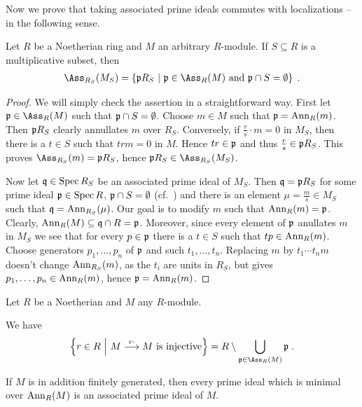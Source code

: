 \documentclass[a4paper,parskip=half,numbers=enddot, DIV=12]{scrreprt}
\begin{document}
Now we prove that taking associated prime ideals commutes with localizations -- in the following sense. 
\begin{prop}
	Let $R$ be a Noetherian ring and $M$ an arbitrary $R$-module. If $S\subseteq R$ is a multiplicative subset, then
	\begin{align*}
		\Ass_{R_S}(M_S)=\left\{\pp R_S\st \pp\in\Ass_R(M)\text{ and }\pp\cap S=\emptyset\right\}\;.
	\end{align*}
\end{prop}
\begin{proof}
	We will simply check the assertion in a straightforward way. First let $\pp\in\Ass_R(M)$ such that $\mathfrak{p}\cap S=\emptyset$. Choose $m\in M$ such that $\mathfrak{p}=\operatorname{Ann}_R(m)$. Then $\mathfrak{p} R_S$ clearly annullates $m$ over $R_S$. Conversely, if $\frac{r}{s}\cdot m=0$ in $M_S$, then there is a $t\in S$ such that $trm=0$ in $M$. Hence $tr\in\mathfrak{p}$ and thus $\frac{r}{s}\in\mathfrak{p} R_S$. This proves $\Ass_{R_S}(m)=\pp R_S$, hence $\pp R_S\in\Ass_{R_S}(M_S)$.
	
	Now let $\mathfrak{q}\in\operatorname{Spec} R_S$ be an associated prime ideal of $M_S$. Then $\mathfrak{q}=\mathfrak{p} R_S$ for some prime ideal $\mathfrak{p}\in\operatorname{Spec} R$, $\mathfrak{p}\cap S=\emptyset$ (cf.\ \cite[Corollary~2.3.1]{alg1}) and there is an element $\mu=\frac{m}{s}\in M_S$ such that $\mathfrak{q}=\operatorname{Ann}_{R_S}(\mu)$. Our goal is to modify $m$ such that $\operatorname{Ann}_R(m)=\mathfrak{p}$. Clearly, $\operatorname{Ann}_R(M)\subseteq \mathfrak{q}\cap R=\mathfrak{p}$. Moreover, since every element of $\mathfrak{p}$ anullates $m$ in $M_S$ we see that for every $p\in\mathfrak{p}$ there is a $t\in S$ such that $tp\in\operatorname{Ann}_R(m)$. Choose generators $p_1,\ldots,p_n$ of $\mathfrak{p}$ and such $t_1,\ldots,t_n$. Replacing $m$ by $t_1\cdots t_nm$ doesn't change $\operatorname{Ann}_{R_S}(m)$, as the $t_i$ are units in $R_S$, but gives $p_1,\ldots,p_n\in\operatorname{Ann}_R(m)$, hence $\mathfrak{p}=\operatorname{Ann}_R(m)$.
\end{proof}
\begin{prop}
	Let $R$ be a Noetherian and $M$ any $R$-module.
	\begin{alphanumerate}
		\item We have
		\begin{align*}
			\left\{r\in R\st M\morphism[r\cdot ]M\text{ is injective}\right\}=R\setminus\bigcup_{\pp\in \Ass_R(M)}\pp\;.
		\end{align*}
		\item If $M$ is in addition finitely generated, then every prime ideal which is minimal over $\operatorname{Ann}_R(M)$ is an associated prime ideal of $M$.
	\end{alphanumerate}
\end{prop}
\end{document}
